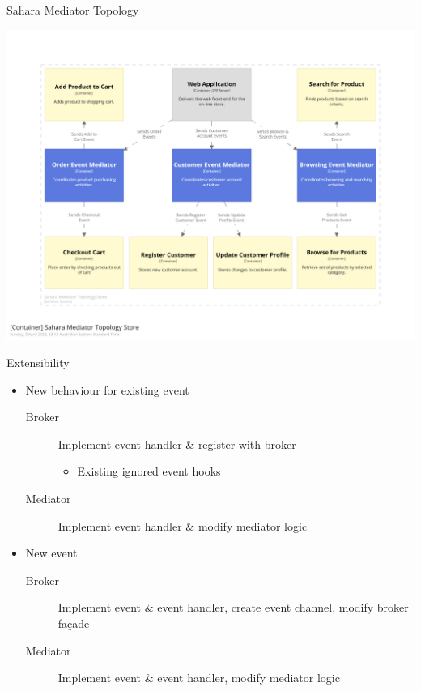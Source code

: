 \documentclass{slide}
\begin{document}
\begin{frame}{Sahara Mediator Topology}
    \begin{adjustwidth}{-10mm}{-10mm}
        \centering
        \includegraphics[trim=195 195 195 195,clip,width=0.69\paperwidth]{diagrams/sahara-mediator-container.png}
    \end{adjustwidth}
\end{frame}

\begin{frame}{Extensibility}
    \vspace{1mm}
    {\LARGE
    \begin{itemize}
        \item New behaviour for existing event
        {\Large
        \begin{description}
            \item[Broker] Implement event handler \& register with broker
            \begin{itemize}
                \item Existing ignored event hooks
            \end{itemize}
            \item[Mediator] Implement event handler \& modify mediator logic
	\end{description}
	}
        \vspace{3mm}
        \item New event
        {\Large
        \begin{description}
            \item[Broker] Implement event \& event handler, create event channel, modify broker façade
            \item[Mediator] Implement event \& event handler, modify mediator logic
	\end{description}
	}
    \end{itemize}
    }
\end{frame}
\end{document}

